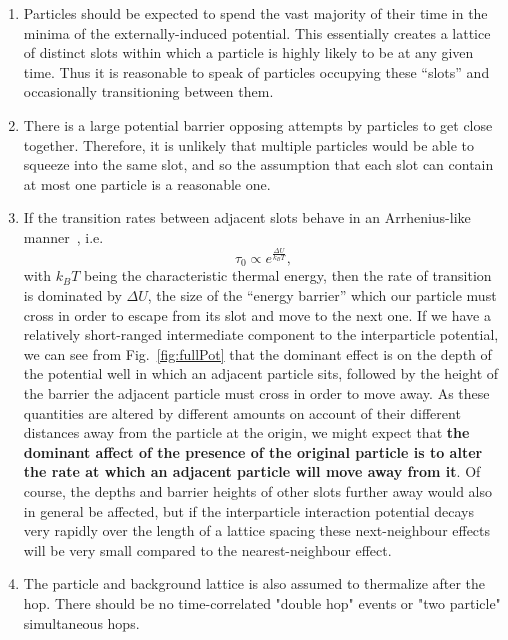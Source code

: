 \begin{enumerate}
\item Particles should be expected to spend the vast majority of their time in the minima of the 
externally-induced potential. This essentially creates a lattice of distinct slots within which a
particle
is highly likely to be at any given time. Thus it is reasonable to speak of particles occupying these 
``slots'' and occasionally transitioning between them.
 \item There is a large potential barrier opposing attempts by particles to get close together. Therefore,
 it is unlikely that multiple particles would be able to squeeze into the same slot,
 and so the assumption that each slot can contain at most one particle is a reasonable one.
 \item If the transition rates between adjacent slots behave in an Arrhenius-like manner~\cite{arrhenius1889, levine2005}, i.e.
 \begin{equation}
  \tau_0 \propto e^{\frac{\Delta U}{k_B T}},
 \end{equation}
 with $k_B T$ being the characteristic thermal energy,
then the rate of transition is dominated by $\Delta U$, the size of the ``energy barrier'' which
our particle must cross in order to escape from its slot and move to the next one. If we have a relatively
short-ranged intermediate component to the interparticle potential, we can see from Fig.~\ref{fig:fullPot}
that the dominant effect is on the depth of the potential well in which an adjacent particle sits, followed
by the height of the barrier the adjacent particle must cross in order to move away. As these
quantities are altered by different amounts on account of their different distances away from the particle
at the origin, we might expect that \textbf{the dominant affect of the presence of the original particle is
to alter the rate at which an adjacent particle will move away from it}. Of course, the depths and barrier
heights of other slots further away would also in general be affected, but if the interparticle interaction potential decays very rapidly over the length of a lattice spacing these next-neighbour effects will be
very small compared to the nearest-neighbour effect.
\item The particle and background lattice is also assumed to thermalize
after the hop. There 
should be no time-correlated "double hop" events or "two particle"
simultaneous hops.
\end{enumerate}

